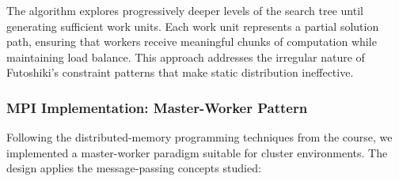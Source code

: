 The algorithm explores progressively deeper levels of the search tree until generating sufficient work units. Each work unit represents a partial solution path, ensuring that workers receive meaningful chunks of computation while maintaining load balance. This approach addresses the irregular nature of Futoshiki's constraint patterns that make static distribution ineffective.

\subsubsection{MPI Implementation: Master-Worker Pattern}
\label{subsubsec:mpi_implementation}
Following the distributed-memory programming techniques from the course, we implemented a master-worker paradigm suitable for cluster environments. The design applies the message-passing concepts studied:
